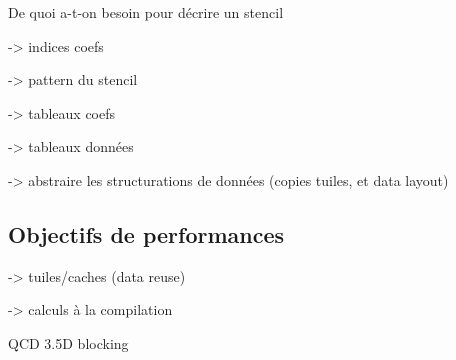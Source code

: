 De quoi a-t-on besoin pour décrire un stencil

-> indices coefs

-> pattern du stencil

-> tableaux coefs

-> tableaux données

-> abstraire les structurations de données (copies tuiles, et data layout)

\subsection{Objectifs de performances}


-> tuiles/caches (data reuse)

-> calculs à la compilation


QCD \cite{Art1}
3.5D blocking \cite{Art11}

